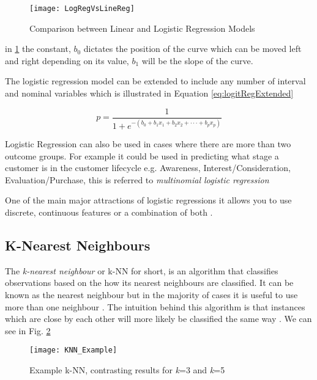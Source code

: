 \begin{figure}[H]
	\texttt{[image: LogRegVsLineReg]}
	\caption{Comparison between Linear and Logistic Regression Models}
	\label{fig:LogRegVsLineReg}
\end{figure}

in \ref{fig:LogRegVsLineReg} the constant, $b_0$ dictates the position of the curve which can be moved left and right depending on its value, $b_1$ will be the slope of the curve. 

The logistic regression model can be extended to include any number of interval and nominal variables which is illustrated in Equation \ref{eq:logitRegExtended}

\begin{equation} \label{eq:logitRegExtended}
p  =  \frac{1}{1 + e^{-(b_0 + b_1x_1 + b_2x_2 +\cdot\cdot\cdot+ b_px_p )}}
\end{equation}

Logistic Regression can also be used in cases where there are more than two outcome groups. For example it could be used in predicting what stage a customer is in the customer lifecycle e.g. Awareness, Interest/Consideration, Evaluation/Purchase, this is referred to \textit{multinomial logistic regression}


One of the main major attractions of logistic regressions it allows you to use discrete, continuous features or a combination of both \citep{lee_application_2005}.

\subsection{K-Nearest Neighbours} \label{kNN}
The \textit{k-nearest neighbour} or {k-NN} for short, is an algorithm that classifies observations based on the how its nearest neighbours are classified. It can be known as the nearest neighbour but in the majority of cases it is useful to use more than one neighbour \citep{henley_k-nearest-neighbour_1996}. The intuition behind this algorithm is that instances which are close by each other will more likely be classified the same way \citep{cover_nearest_1967}. We can see in Fig. \ref{fig:KNN_Example}\\ %


\begin{figure}[H]
	\texttt{[image: KNN\_Example]}
	\caption{Example k-NN, contrasting results for \textit{k}=3 and \textit{k}=5 }
	\label{fig:KNN_Example}
\end{figure}

